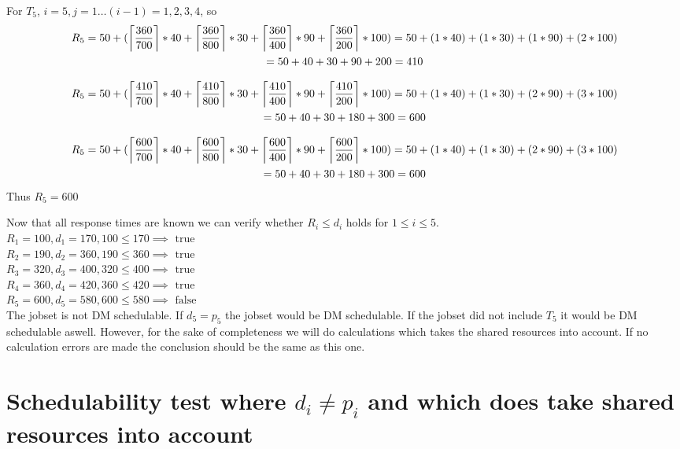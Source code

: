\documentclass[10pt]{article}
\DeclarePairedDelimiter\ceil{\lceil}{\rceil}
\begin{document}
For $T_5$, $i=5, j=1\dots (i-1) = 1,2,3,4$, so
\begin{multline}
R_5 = 50 + (\ceil*{\frac{360}{700}} * 40 + \ceil*{\frac{360}{800}} * 30 + \ceil*{\frac{360}{400}} * 90 + \ceil*{\frac{360}{200}} * 100) = 50 + (1 * 40) + (1 * 30) + (1 * 90) + (2 * 100) \\ = 50 + 40 + 30 + 90 + 200 = 410
\end{multline}

\begin{multline}
R_5 = 50 + (\ceil*{\frac{410}{700}} * 40 + \ceil*{\frac{410}{800}} * 30 + \ceil*{\frac{410}{400}} * 90 + \ceil*{\frac{410}{200}} * 100) = 50 + (1 * 40) + (1 * 30) + (2 * 90) + (3 * 100) \\ = 50 + 40 + 30 + 180 + 300 = 600
\end{multline}

\begin{multline}
R_5 = 50 + (\ceil*{\frac{600}{700}} * 40 + \ceil*{\frac{600}{800}} * 30 + \ceil*{\frac{600}{400}} * 90 + \ceil*{\frac{600}{200}} * 100) = 50 + (1 * 40) + (1 * 30) + (2 * 90) + (3 * 100) \\ = 50 + 40 + 30 + 180 + 300 = 600
\end{multline}
Thus $R_5 = 600$

Now that all response times are known we can verify whether $R_i \leq d_i$ holds for $ 1 \leq i \leq 5$.\\
$R_1 = 100, d_1 = 170, 100 \leq 170 \implies \text{ true }$ \\
$R_2 = 190, d_2 = 360, 190 \leq 360 \implies \text{ true }$ \\
$R_3 = 320, d_3 = 400, 320 \leq 400 \implies \text{ true }$ \\
$R_4 = 360, d_4 = 420, 360 \leq 420 \implies \text{ true }$ \\
$R_5 = 600, d_5 = 580, 600 \leq 580 \implies \text{ false }$ \\
The jobset is not DM schedulable. If $d_5 = p_5$ the jobset would be DM schedulable. 
If the jobset did not include $T_5$ it would be DM schedulable aswell.
However, for the sake of completeness we will do calculations which takes the shared resources into account.
If no calculation errors are made the conclusion should be the same as this one.

\newpage

\section{Schedulability test where $d_i \neq p_i$ and which does take shared resources into account}
\end{document}
